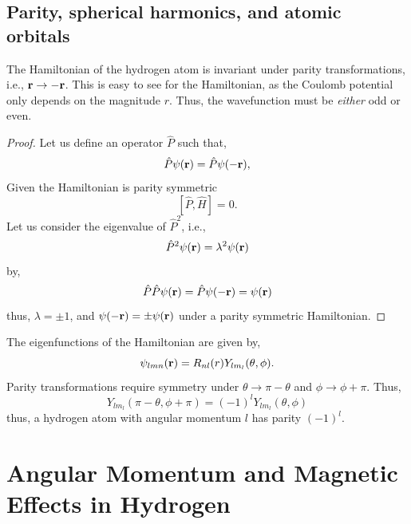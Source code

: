\documentclass{book}
\begin{document}
\section{Parity, spherical harmonics, and atomic orbitals}
The Hamiltonian of the hydrogen atom is invariant under parity transformations, i.e., $\vb{r} \to - \vb{r}$. This is easy to see for the Hamiltonian, as the Coulomb potential only depends on the magnitude $r$. Thus, the wavefunction must be \textit{either} odd or even.
\begin{proof}
	Let us define an operator $\hat{P}$ such that,
	\begin{equation}
		\hat{P}\psi(\vb{r}) = \hat{P}\psi(-\vb{r}),
	\end{equation}
	Given the Hamiltonian is parity symmetric
	\begin{equation}
		\left[\hat{P},\hat{H}\right] = 0.
	\end{equation}
	Let us consider the eigenvalue of $\hat{P}^2$, i.e.,
	\begin{equation}
		\hat{P}^2\psi(\vb{r}) = \lambda^2 \psi(\vb{r})
	\end{equation}
	by,
	\begin{equation}
		\hat{P}\hat{P}\psi(\vb{r}) = \hat{P}\psi(-\vb{r}) = \psi(\vb{r})
	\end{equation}
	thus, $\lambda = \pm 1$, and $\psi(-\vb{r}) = \pm \psi(\vb{r})$ under a parity symmetric Hamiltonian.
\end{proof}
The eigenfunctions of the Hamiltonian are given by,
\begin{equation}
	\psi_{lmn}(\vb{r}) = R_{nl}(r)Y_{lm_l}(\theta,\phi).
\end{equation}
Parity transformations require symmetry under $\theta \to \pi - \theta$ and $\phi \to \phi + \pi$. Thus,
\begin{equation}
	Y_{lm_l}(\pi - \theta, \phi + \pi) = (-1)^lY_{lm_l}(\theta,\phi)
\end{equation}
thus, a hydrogen atom with angular momentum $l$ has parity $(-1)^l$.
\chapter{Angular Momentum and Magnetic Effects in Hydrogen}
\end{document}
